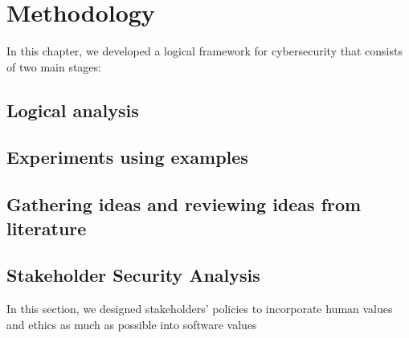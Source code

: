 \chapter{Methodology}
In this chapter, we  developed a logical framework for cybersecurity that consists of two main stages:

\section{Logical analysis}

\section{Experiments using examples}

\section{Gathering ideas and reviewing ideas from literature}

\section{Stakeholder Security Analysis}
In this section, we designed stakeholders' policies to incorporate human
values and ethics as much as possible into software values

\iffalse
\section{A social contract for cyberspace}
We proposed a social contract for cyberspace that can manage Stakeholders'
policies and ensure their respect by their owners.
\fi

